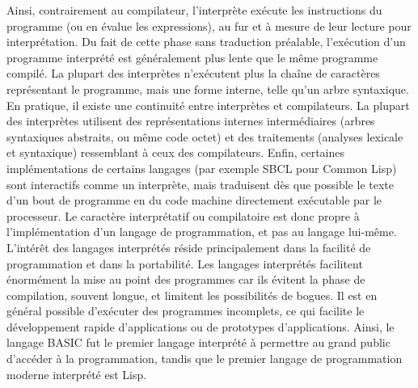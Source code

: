 Ainsi, contrairement au compilateur, l'interprète exécute les instructions du programme (ou en évalue les expressions), au fur et à mesure de leur lecture pour interprétation. Du fait de cette phase sans traduction préalable, l'exécution d'un programme interprété est généralement plus lente que le même programme compilé. La plupart des interprètes n'exécutent plus la chaîne de caractères représentant le programme, mais une forme interne, telle qu'un arbre syntaxique.
\\[0.5cm]

En pratique, il existe une continuité entre interprètes et compilateurs. La plupart des interprètes utilisent des représentations internes intermédiaires (arbres syntaxiques abstraits, ou même code octet) et des traitements (analyses lexicale et syntaxique) ressemblant à ceux des compilateurs. Enfin, certaines implémentations de certains langages (par exemple SBCL pour Common Lisp) sont interactifs comme un interprète, mais traduisent dès que possible le texte d'un bout de programme en du code machine directement exécutable par le processeur. Le caractère interprétatif ou compilatoire est donc propre à l'implémentation d'un langage de programmation, et pas au langage lui-même.
\\[0.5cm]
L'intérêt des langages interprétés réside principalement dans la facilité de programmation et dans la portabilité. Les langages interprétés facilitent énormément la mise au point des programmes car ils évitent la phase de compilation, souvent longue, et limitent les possibilités de bogues. Il est en général possible d'exécuter des programmes incomplets, ce qui facilite le développement rapide d'applications ou de prototypes d'applications. Ainsi, le langage BASIC fut le premier langage interprété à permettre au grand public d'accéder à la programmation, tandis que le premier langage de programmation moderne interprété est Lisp.
\\[0.5cm]

